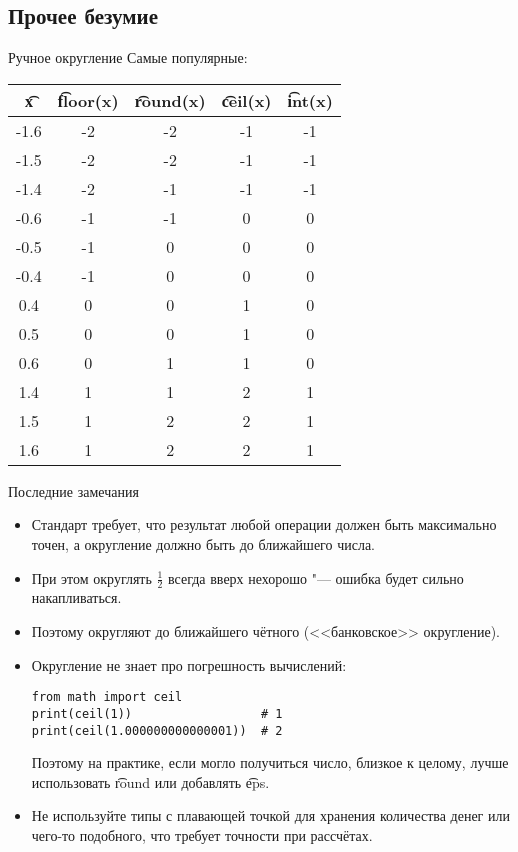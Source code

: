 \subsection{Прочее безумие}

\begin{frame}
\end{frame}

\begin{frame}{Ручное округление}
	Самые популярные:
	\begin{center}
		\begin{tabular}{|c|c|c|c|c|}
			\hline
			\t{x} & \t{floor(x)} & \t{round(x)} & \t{ceil(x)} & \t{int(x) } \\\hline
			-1.6 & -2 & -2 & -1 & -1 \\\hline
			-1.5 & -2 & -2 & -1 & -1 \\\hline
			-1.4 & -2 & -1 & -1 & -1 \\\hline
			-0.6 & -1 & -1 & 0 & 0 \\\hline
			-0.5 & -1 & 0 & 0 & 0 \\\hline
			-0.4 & -1 & 0 & 0 & 0 \\\hline
			0.4 & 0 & 0 & 1 & 0 \\\hline
			0.5 & 0 & 0 & 1 & 0 \\\hline
			0.6 & 0 & 1 & 1 & 0 \\\hline
			1.4 & 1 & 1 & 2 & 1 \\\hline
			1.5 & 1 & 2 & 2 & 1 \\\hline
			1.6 & 1 & 2 & 2 & 1 \\\hline
		\end{tabular}
	\end{center}
\end{frame}

\begin{frame}[fragile]{Последние замечания}
	\begin{itemize}
		\item
			Стандарт требует, что результат любой операции должен быть максимально точен, а округление должно быть до ближайшего числа.
		\item
			При этом округлять $\frac{1}{2}$ всегда вверх нехорошо "--- ошибка будет сильно накапливаться.
		\item
			Поэтому округляют до ближайшего чётного (<<банковское>> округление).
		\item
			Округление не знает про погрешность вычислений:
\begin{verbatim}
from math import ceil
print(ceil(1))                  # 1
print(ceil(1.000000000000001))  # 2
\end{verbatim}
	Поэтому на практике, если могло получиться число, близкое к целому, лучше использовать \t{round} или добавлять \t{eps}.
		\item
			Не используйте типы с плавающей точкой для хранения количества денег или чего-то подобного, что требует точности при рассчётах.
	\end{itemize}
\end{frame}

